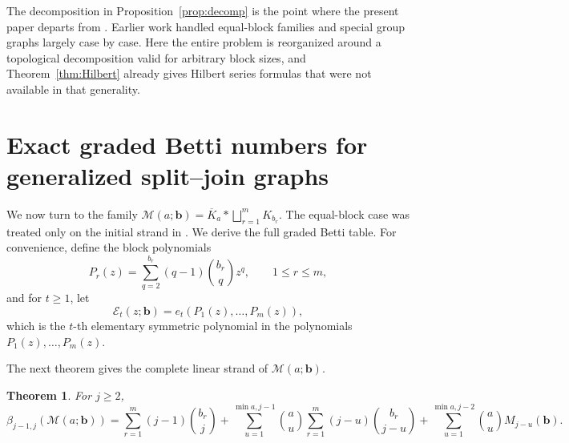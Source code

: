 \documentclass[12pt]{article}
\newtheorem{theorem}{Theorem}[section]
\theoremstyle{definition}
\theoremstyle{remark}
\newcommand{\EE}{\mathcal{E}}
\newcommand{\MM}{\mathcal{M}}
\newcommand{\bk}[1]{\mathbf{#1}}
\begin{document}
	
	
	The decomposition in Proposition~\ref{prop:decomp} is the point where the present paper departs from \cite{Rather2024,RatherWang2026}. Earlier work handled equal-block families and special group graphs largely case by case. Here the entire problem is reorganized around a topological decomposition valid for arbitrary block sizes, and Theorem~\ref{thm:Hilbert} already gives Hilbert series formulas that were not available in that generality.
	
	\section{Exact graded Betti numbers for generalized split--join graphs}\label{sec:split}
	
	We now turn to the family
	$ \MM(a;\bk{b})=\overline{K}_a * \bigsqcup_{r=1}^m K_{b_r}. $
	The equal-block case was treated only on the initial strand in \cite{Rather2024}. We derive the full graded Betti table.
	 For convenience, define the block polynomials
	$$
	P_r(z)=\sum_{q=2}^{b_r}(q-1)\binom{b_r}{q}z^q,
	\qquad 1\leq r\leq m,
	$$
	and for $t\geq 1$, let
	$$
	\EE_t(z;\bk{b})=e_t(P_1(z),\dots,P_m(z)),
	$$
	which is the $t$-th elementary symmetric polynomial in the polynomials $P_1(z),\dots,P_m(z)$.
	
	 \medskip The next theorem gives the complete linear strand of $\MM(a;\bk{b})$.
	
	\begin{theorem}\label{thm:split-linear}
		For $j\geq 2$,
		$$
		\beta_{j-1,j}(\MM(a;\bk{b}))=
		\sum_{r=1}^m (j-1)\binom{b_r}{j}
		+
		\sum_{u=1}^{\min{a,j-1}}
		\binom{a}{u}
		\sum_{r=1}^m (j-u)\binom{b_r}{j-u}
		+
		\sum_{u=1}^{\min{a,j-2}}
		\binom{a}{u}M_{j-u}(\bk{b}).
		$$
	\end{theorem}
	
\end{document}
